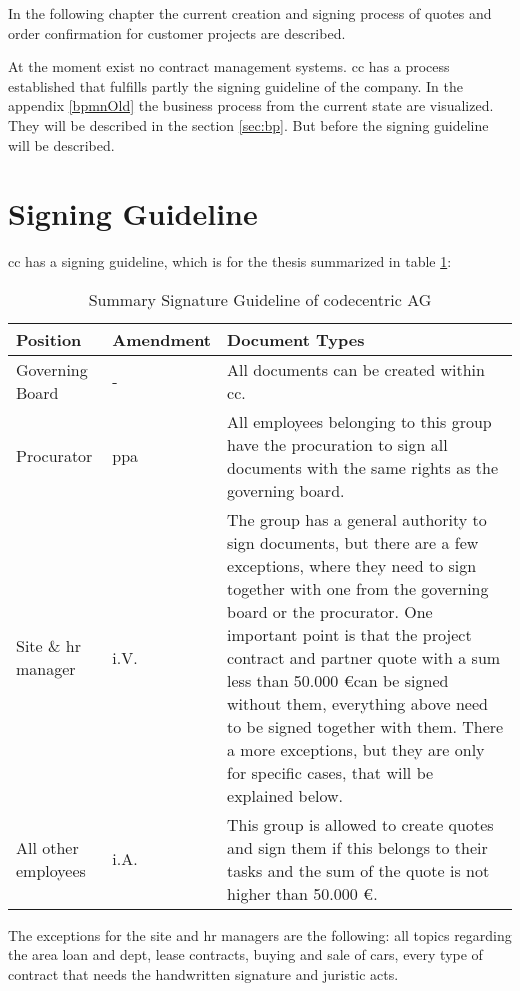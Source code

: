 In the following chapter the current creation and signing process of quotes and order confirmation for customer projects are described.

At the moment exist no contract management systems. \Gls{cc} has a process established that fulfills partly the signing guideline of the company. In the appendix \ref{bpmnOld} the business process from the current state are visualized. They will be described in the section \ref{sec:bp}. But before the signing guideline will be described.

\section{Signing Guideline} \label{sec:signingGuideline}

\Gls{cc} has a signing guideline, which is for the thesis summarized in table \ref{tab:summarySignatureGuideline}:
\begin{table}[h!]
	\begin{tabular}{|p{3cm}|p{2cm}|p{10cm}|}\hline
		\rowcolor{Gray}Position & Amendment & Document Types \\ \hline
		Governing Board & - & All documents can be created within \gls{cc}. \\ \hline
		Procurator & ppa & All employees belonging to this group have the procuration to sign all documents with the same rights as the governing board.\\ \hline
		Site \& \gls{hr} manager & i.V. & The group has a general authority to sign documents, but there are a few exceptions, where they need to sign together with one from the governing board or the procurator. One important point is that the project contract and partner quote with a sum less than 50.000 \euro can be signed without them, everything above need to be signed together with them. There a more exceptions, but they are only for specific cases, that will be explained below. \\ \hline
		All other employees & i.A. & This group is allowed to create quotes and sign them if this belongs to their tasks and the sum of the quote is not higher than 50.000 \euro. \\ \hline
	\end{tabular}
	\caption{Summary Signature Guideline of codecentric AG}
	\label{tab:summarySignatureGuideline}
\end{table}

The exceptions for the site and \gls{hr} managers are the following: all topics regarding the area loan and dept, lease contracts, buying and sale of cars, every type of contract that needs the handwritten signature and juristic acts.

